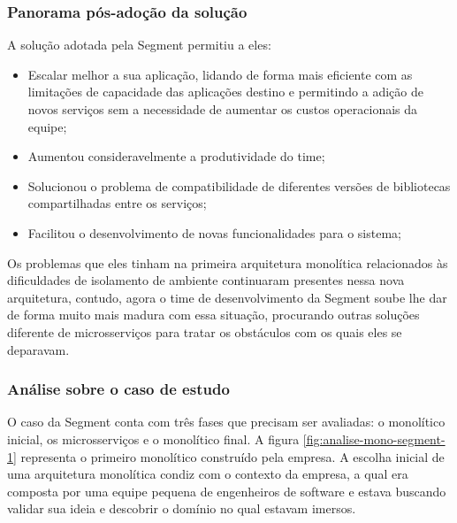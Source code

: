 \subsubsection{Panorama pós-adoção da solução}

A solução adotada pela Segment permitiu a eles:

\begin{itemize}
    \item Escalar melhor a sua aplicação, lidando de forma mais eficiente com as limitações de
        capacidade das aplicações destino e permitindo a adição de novos serviços sem a necessidade
        de aumentar os custos operacionais da equipe;
    \item Aumentou consideravelmente a produtividade do time;
    \item Solucionou o problema de compatibilidade de diferentes versões de bibliotecas
        compartilhadas entre os serviços;
    \item Facilitou o desenvolvimento de novas funcionalidades para o sistema;
\end{itemize}

Os problemas que eles tinham na primeira arquitetura monolítica relacionados às dificuldades de
isolamento de ambiente continuaram presentes nessa nova arquitetura, contudo, agora o time de
desenvolvimento da Segment soube lhe dar de forma muito mais madura com essa situação, procurando
outras soluções diferente de microsserviços para tratar os obstáculos com os quais eles se
deparavam.

\subsubsection{Análise sobre o caso de estudo}

O caso da Segment conta com três fases que precisam ser avaliadas: o monolítico inicial, os
microsserviços e o monolítico final. A figura \autoref{fig:analise-mono-segment-1} representa o
primeiro monolítico construído pela empresa. A escolha inicial de uma arquitetura monolítica condiz
com o contexto da empresa, a qual era composta por uma equipe pequena de engenheiros de software e
estava buscando validar sua ideia e descobrir o domínio no qual estavam imersos. 

